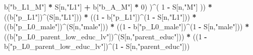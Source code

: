 \documentclass[
]{book}
\newenvironment{Shaded}{\begin{snugshade}}{\end{snugshade}}
\newcommand{\DecValTok}[1]{\textcolor[rgb]{0.00,0.00,0.81}{#1}}
\newcommand{\NormalTok}[1]{#1}
\newcommand{\SpecialCharTok}[1]{\textcolor[rgb]{0.81,0.36,0.00}{\textbf{#1}}}
\newcommand{\StringTok}[1]{\textcolor[rgb]{0.31,0.60,0.02}{#1}}
\begin{document}
\begin{Shaded}
\begin{Highlighting}[]
\NormalTok{                b[}\StringTok{"b\_L1\_M"}\NormalTok{] }\SpecialCharTok{*}\NormalTok{ S[n,}\StringTok{"L1"}\NormalTok{] }\SpecialCharTok{+}
\NormalTok{                b[}\StringTok{"b\_A\_M"}\NormalTok{] }\SpecialCharTok{*} \DecValTok{0}\NormalTok{) )}\SpecialCharTok{\^{}}\NormalTok{( }\DecValTok{1} \SpecialCharTok{{-}}\NormalTok{ S[n,}\StringTok{"M"}\NormalTok{] ))  }\SpecialCharTok{*}
\NormalTok{      ((b[}\StringTok{"p\_L1"}\NormalTok{])}\SpecialCharTok{\^{}}\NormalTok{(S[n,}\StringTok{"L1"}\NormalTok{])) }\SpecialCharTok{*}
\NormalTok{      ((}\DecValTok{1} \SpecialCharTok{{-}}\NormalTok{ b[}\StringTok{"p\_L1"}\NormalTok{])}\SpecialCharTok{\^{}}\NormalTok{(}\DecValTok{1} \SpecialCharTok{{-}}\NormalTok{ S[n,}\StringTok{"L1"}\NormalTok{])) }\SpecialCharTok{*}
\NormalTok{      ((b[}\StringTok{"p\_L0\_male"}\NormalTok{])}\SpecialCharTok{\^{}}\NormalTok{(S[n,}\StringTok{"male"}\NormalTok{])) }\SpecialCharTok{*} 
\NormalTok{      ((}\DecValTok{1} \SpecialCharTok{{-}}\NormalTok{ b[}\StringTok{"p\_L0\_male"}\NormalTok{])}\SpecialCharTok{\^{}}\NormalTok{(}\DecValTok{1} \SpecialCharTok{{-}}\NormalTok{ S[n,}\StringTok{"male"}\NormalTok{])) }\SpecialCharTok{*} 
\NormalTok{      ((b[}\StringTok{"p\_L0\_parent\_low\_educ\_lv"}\NormalTok{])}\SpecialCharTok{\^{}}\NormalTok{(S[n,}\StringTok{"parent\_educ"}\NormalTok{])) }\SpecialCharTok{*}
\NormalTok{      ((}\DecValTok{1} \SpecialCharTok{{-}}\NormalTok{ b[}\StringTok{"p\_L0\_parent\_low\_educ\_lv"}\NormalTok{])}\SpecialCharTok{\^{}}\NormalTok{(}\DecValTok{1} \SpecialCharTok{{-}}\NormalTok{ S[n,}\StringTok{"parent\_educ"}\NormalTok{])) }
    

\end{Highlighting}
\end{Shaded}
\end{document}
